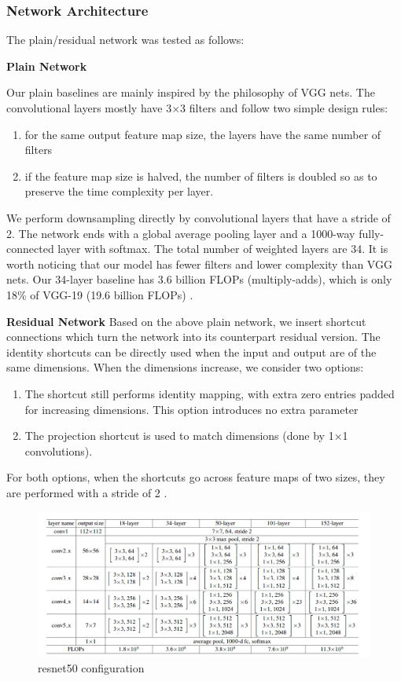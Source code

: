 \documentclass[11pt]{article}
\begin{document}
	\subsubsection{Network Architecture}

	The plain/residual network was tested as follows:

	\textbf{Plain Network}

	Our plain baselines are mainly inspired by the philosophy of VGG nets.  The
	convolutional layers mostly have 3×3 filters and follow two simple design
	rules:

	\begin{enumerate}
		\item for the same output feature map size, the layers have the same
			number of filters
		\item if the feature map size is halved, the number of filters is
			doubled so as to preserve the time complexity per layer.
	\end{enumerate}

	We perform downsampling directly by convolutional layers that have a stride
	of 2. The network ends with a global average pooling layer and a 1000-way
	fully-connected layer with softmax. The total number of weighted layers are
	34.  It is worth noticing that our model has fewer filters and lower
	complexity than VGG nets. Our 34-layer baseline has 3.6 billion FLOPs
	(multiply-adds), which is only 18\% of VGG-19 (19.6 billion FLOPs)
	\cite[3]{he2015deep} .

	\textbf{Residual Network}
	Based on the above plain network, we insert shortcut connections which turn
	the network into its counterpart residual version. The identity shortcuts
	can be directly used when the input and output are of the same dimensions.
	When the dimensions increase, we consider two options:
	\begin{enumerate}
		\item The shortcut still performs identity mapping, with extra zero
			entries padded for increasing dimensions. This option introduces no
			extra parameter
		\item The projection shortcut is used to match dimensions (done by 1×1
			convolutions).
	\end{enumerate}
	For both options, when the shortcuts go across feature maps of two sizes,
	they are performed with a stride of 2 \cite[4]{he2015deep} .

	\begin{figure}[h]
		\centering
		\includegraphics[width=\linewidth]{imgs/resnet_arch.png}
		\caption{resnet50 configuration}%
		\label{fig:resnet conf}
	\end{figure}
\end{document}

